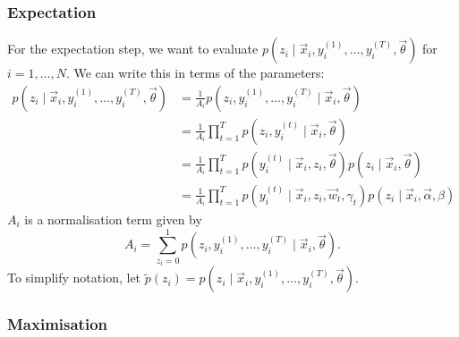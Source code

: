       \subsubsection{Expectation}

        For the expectation step, we want to evaluate $p(z_i \mid \vec x_i, y_i^{(1)}, \dots, y_i^{(T)}, \vec \theta)$ for $i = 1, \dots, N$. We can write this in terms of the parameters:
        \begin{align*}
            p(z_i \mid \vec x_i, y_i^{(1)}, \dots, y_i^{(T)}, \vec \theta) &= \frac{1}{A_i} p(z_i, y_i^{(1)}, \dots, y_i^{(T)} \mid \vec x_i, \vec \theta)\\
                &= \frac{1}{A_i} \prod_{t = 1}^T p(z_i, y_i^{(t)} \mid \vec x_i, \vec \theta)\\
                &= \frac{1}{A_i} \prod_{t = 1}^T p(y_i^{(t)} \mid \vec x_i, z_i, \vec \theta) p(z_i \mid \vec x_i, \vec \theta)\\
                &= \frac{1}{A_i} \prod_{t = 1}^T p(y_i^{(t)} \mid \vec x_i, z_i, \vec w_t, \gamma_t) p(z_i \mid \vec x_i, \vec \alpha, \beta)
        \end{align*}
        $A_i$ is a normalisation term given by
        \[
            A_i = \sum_{z_i = 0}^1 p(z_i, y_i^{(1)}, \dots, y_i^{(T)} \mid \vec x_i, \vec \theta).
        \]
        To simplify notation, let $\tilde p(z_i) = p(z_i \mid \vec x_i, y_i^{(1)}, \dots, y_i^{(T)}, \vec \theta)$.

      \subsubsection{Maximisation}

